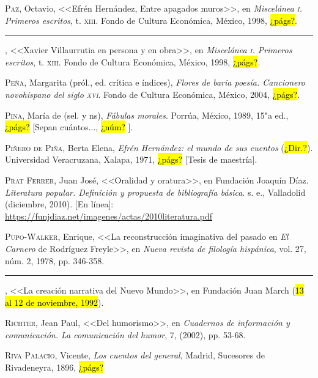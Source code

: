 \documentclass[14pt,twoside,final]{extbook} %
\begin{document}
\textsc{Paz}, Octavio, <<Efrén Hernández, Entre apagados muros>>, en \emph{Miscelánea \textsc{i}. Primeros escritos}, t. \textsc{xiii}. Fondo de Cultura Económica, México, 1998, \hl{¿págs?}.\label{bib:paz1998a}

\rule{1cm}{0.4pt}, <<Xavier Villaurrutia en persona y en obra>>, en \emph{Miscelánea \textsc{i}. Primeros escritos}, t. \textsc{xiii}. Fondo de Cultura Económica, México, 1998, \hl{¿págs?}.\label{bib:paz1998b}

\textsc{Peña}, Margarita (pról., ed. crítica e índices), \emph{Flores de baria poesía. Cancionero novohispano del siglo \textsc{xvi}}. Fondo de Cultura Económica, México, 2004, \hl{¿págs?}.\label{bib:peña2004}

\textsc{Pina}, María de (sel. y ns), \emph{Fábulas morales}. Porrúa, México, 1989, 15"a ed., \hl{¿págs?} [Sepan cuántos..., \hl{¿núm?} ].\label{bib:pina1989}

\textsc{Piñero de Piña}, Berta Elena, \emph{Efrén Hernández: el mundo de sus cuentos} (\hl{¿Dir.?}). Universidad Veracruzana, Xalapa, 1971, \hl{¿págs?} [Tesis de maestría].\label{bib:piñero1971}

\textsc{Prat Ferrer}, Juan José, <<Oralidad y oratura>>, en Fundación Joaquín Díaz. \emph{Literatura popular. Definición y propuesta de bibliografía básica}. s. e., Valladolid (diciembre, 2010). [En línea]: \url{https://funjdiaz.net/imagenes/actas/2010literatura.pdf}

\textsc{Pupo-Walker}, Enrique, <<La reconstrucción imaginativa del pasado en \emph{El Carnero} de Rodríguez Freyle>>, en \emph{Nueva revista de filología hispánica}, vol. 27, núm. 2, 1978, pp. 346-358.\label{bib:pupowalker1978}

\rule{1cm}{0.4pt}, <<La creación narrativa del Nuevo Mundo>>, en Fundación Juan March (\hl{13 al 12 de noviembre, 1992}).\label{bib:pupowalker1992}

\textsc{Richter}, Jean Paul, <<Del humorismo>>, en \emph{Cuadernos de información y comunicación. La comunicación del humor}, 7, (2002), pp. 53-68.\label{bib:richter2002}

\textsc{Riva Palacio}, Vicente, \emph{Los cuentos del general}, Madrid, Sucesores de Rivadeneyra, 1896, \hl{¿págs?}\label{bib:rivapalacio1896}
\end{document}
